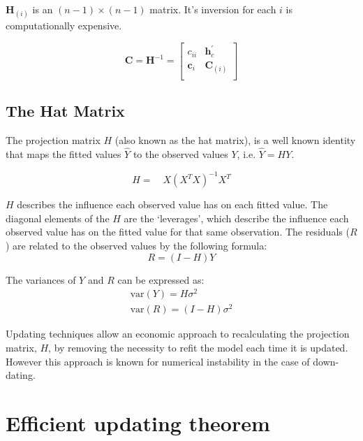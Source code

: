 \documentclass[MAIN.tex]{subfiles}
\begin{document}
	$\boldsymbol{H}_{(i)}$ is an $(n-1) \times (n-1)$ matrix. It's inversion for each $i$ is computationally expensive.
	
	\begin{equation*}
	\boldsymbol{C} = \boldsymbol{H}^{-1} =\left[%
	\begin{array}{cc}
	c_{ii} & \boldsymbol{h}^{\prime}_{c}\\
	\boldsymbol{c}_{i} & \boldsymbol{C}_{(i)}\\
	\end{array}%
	\right]
	\end{equation*}
	
	\subsection{The Hat Matrix} %
	
	The projection matrix $H$ (also known as the hat matrix), is a
	well known identity that maps the fitted values $\hat{Y}$ to the
	observed values $Y$, i.e. $\hat{Y} = HY$.
	
	\begin{equation}
	H =\quad X(X^{T}X)^{-1}X^{T}
	\end{equation}
	
	$H$ describes the influence each observed value has on each fitted
	value. The diagonal elements of the $H$ are the `leverages', which
	describe the influence each observed value has on the fitted value
	for that same observation. The residuals ($R$) are related to the
	observed values by the following formula:
	\begin{equation}
	R = (I-H)Y
	\end{equation}
	
	The variances of $Y$ and $R$ can be expressed as:
	\begin{eqnarray}
	\mbox{var}(Y) = H\sigma^{2} \nonumber\\
	\mbox{var}(R) = (I-H)\sigma^{2}
	\end{eqnarray}
	
	Updating techniques allow an economic approach to recalculating
	the projection matrix, $H$, by removing the necessity to refit the
	model each time it is updated. However this approach is known for
	numerical instability in the case of down-dating.
	
	\section{Efficient updating theorem}
	
\end{document}
